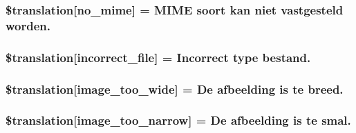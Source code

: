 \subsubsection[{\$translation}]{\setlength{\rightskip}{0pt plus 5cm}\$translation\mbox{[}\textquotesingle{}no\+\_\+mime\textquotesingle{}\mbox{]} = \textquotesingle{}M\+I\+M\+E soort kan niet vastgesteld worden.\textquotesingle{}}\label{class_8upload_8nl___n_l_8php_a191a55df8e3bb7f3c51b70f3c1932e02}
\hypertarget{class_8upload_8nl___n_l_8php_a4d32343e2699edd6fd435f9c832cb9c7}{}
\subsubsection[{\$translation}]{\setlength{\rightskip}{0pt plus 5cm}\$translation\mbox{[}\textquotesingle{}incorrect\+\_\+file\textquotesingle{}\mbox{]} = \textquotesingle{}Incorrect type bestand.\textquotesingle{}}\label{class_8upload_8nl___n_l_8php_a4d32343e2699edd6fd435f9c832cb9c7}
\hypertarget{class_8upload_8nl___n_l_8php_a0dd3e4930ca1f59ae280f4b1006525cd}{}
\subsubsection[{\$translation}]{\setlength{\rightskip}{0pt plus 5cm}\$translation\mbox{[}\textquotesingle{}image\+\_\+too\+\_\+wide\textquotesingle{}\mbox{]} = \textquotesingle{}De afbeelding is te breed.\textquotesingle{}}\label{class_8upload_8nl___n_l_8php_a0dd3e4930ca1f59ae280f4b1006525cd}
\hypertarget{class_8upload_8nl___n_l_8php_a5c9a4cd67fd21c32e0a3b434591a6037}{}
\subsubsection[{\$translation}]{\setlength{\rightskip}{0pt plus 5cm}\$translation\mbox{[}\textquotesingle{}image\+\_\+too\+\_\+narrow\textquotesingle{}\mbox{]} = \textquotesingle{}De afbeelding is te smal.\textquotesingle{}}\label{class_8upload_8nl___n_l_8php_a5c9a4cd67fd21c32e0a3b434591a6037}
\hypertarget{class_8upload_8nl___n_l_8php_aa27bde361343f3b63c7cd441860024f8}{}
